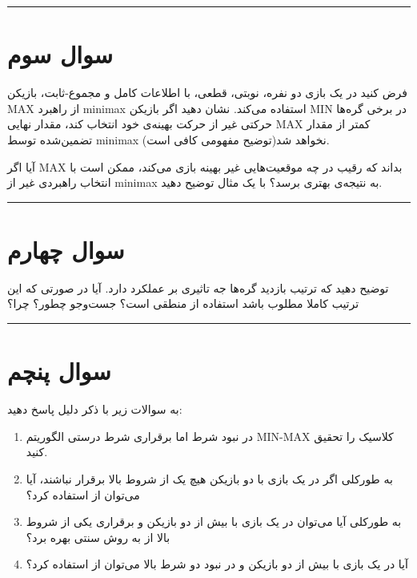 \documentclass[a4paper,10pt]{article}
\begin{document}
\bigskip
\bigskip
\textcolor{AccentCyan}{\rule{\linewidth}{0.4pt}}
\section{\textcolor{AccentGold}{سوال سوم}}

فرض کنید در یک بازی دو نفره، نوبتی، قطعی، با اطلاعات کامل و مجموع-ثابت، بازیکن MAX از راهبرد minimax استفاده می‌کند. نشان دهید اگر بازیکن MIN در برخی گره‌ها حرکتی غیر از حرکت بهینه‌ی خود انتخاب کند، مقدار نهایی MAX کمتر از مقدار تضمین‌شده توسط minimax نخواهد شد(توضیح مفهومی کافی است). 

آیا اگر MAX بداند که رقیب در چه موقعیت‌هایی غیر بهینه بازی می‌کند، ممکن است با انتخاب راهبردی غیر از minimax به نتیجه‌ی بهتری برسد؟ با یک مثال توضیح دهید.

\bigskip
\bigskip
\textcolor{AccentCyan}{\rule{\linewidth}{0.4pt}}
\section{\textcolor{AccentGold}{سوال چهارم}}

توضیح دهید که ترتیب بازدید گره‌ها جه تاثیری بر عملکرد  دارد. آیا در صورتی که این ترتیب کاملا مطلوب باشد  استفاده از  منطقی است؟ جست‌و‌جو چطور؟ چرا؟ 

\bigskip
\bigskip
\textcolor{AccentCyan}{\rule{\linewidth}{0.4pt}}
\section{\textcolor{AccentGold}{سوال پنچم}}

به سوالات زیر با ذکر دلیل پاسخ دهید:

\begin{enumerate}
	\renewcommand{\labelenumi}{\textcolor{AccentCyan}{\arabic{enumi}}}
	\item 
	در نبود شرط  اما برقراری شرط  درستی الگوریتم MIN-MAX کلاسیک را تحقیق کنید. 
	\item 
	به طورکلی اگر در یک بازی با دو بازیکن هیچ یک از شروط بالا برقرار نباشند، آیا می‌توان از  استفاده کرد؟
	\item 
	به طورکلی آیا می‌توان در یک بازی با بیش از دو بازیکن و برقراری یکی از شروط بالا از  به روش سنتی بهره برد؟
	\item 
	آیا در یک بازی با بیش از دو بازیکن و در نبود دو شرط بالا می‌توان از  استفاده کرد؟
\end{enumerate}
\end{document}

